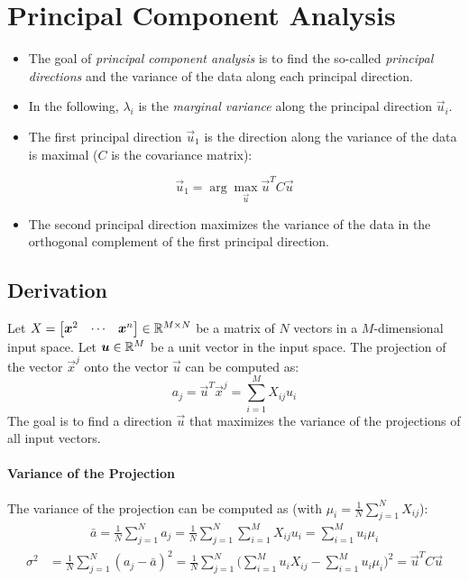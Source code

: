 	\section{Principal Component Analysis}
		\begin{itemize}
			\item The goal of \emph{principal component analysis} is to find the so-called \emph{principal directions} and the variance of the data along each principal direction.
			\item In the following, \( \lambda_i \) is the \emph{marginal variance} along the principal direction \(\vec{u}_i\).
			\item The first principal direction \(\vec{u}_1\) is the direction along the variance of the data is maximal (\(C\) is the covariance matrix):
		\end{itemize}
		\begin{equation}
			\vec{u}_1 = \arg\max\limits_{\vec{u}} \vec{u}^T C \vec{u}
		\end{equation}
		\begin{itemize}
			\item The second principal direction maximizes the variance of the data in the orthogonal complement of the first principal direction.
		\end{itemize}

		\subsection{Derivation}
			Let \( X = \begin{bmatrix} \bm{x}^2 & \cdots & \bm{x}^n \end{bmatrix} \in \mathbb{R}^{M \times N} \) be a matrix of \(N\) vectors in a \(M\)-dimensional input space. Let \( \bm{u} \in \mathbb{R}^M \) be a unit vector in the input space. The projection of the vector \( \vec{x}^j \) onto the vector \(\vec{u}\) can be computed as:
			\begin{equation}
				a_j = \vec{u}^T \vec{x}^j = \sum_{i = 1}^{M} X_{ij} u_i
			\end{equation}
			The goal is to find a direction \(\vec{u}\) that maximizes the variance of the projections of all input vectors.

			\paragraph{Variance of the Projection} %
				The variance of the projection can be computed as (with \( \mu_i = \frac{1}{N} \sum_{j = 1}^{N} X_{ij} \)):
				\begin{align}
					\bar{a} = \frac{1}{N} \sum_{j = 1}^{N} a_j = \frac{1}{N} \sum_{j = 1}^{N} \sum_{i = 1}^{M} X_{ij} u_i = \sum_{i = 1}^{M} u_i \mu_i
				\end{align}
				\begin{align}
					\sigma^2 & = \frac{1}{N} \sum_{j = 1}^{N} (a_j - \bar{a})^2 = \frac{1}{N} \sum_{j = 1}^{N} \Bigg( \sum_{i = 1}^{M} u_i X_{ij} - \sum_{i = 1}^{M} u_i \mu_i \Bigg)^2 = \vec{u}^T C \vec{u}
				\end{align}

